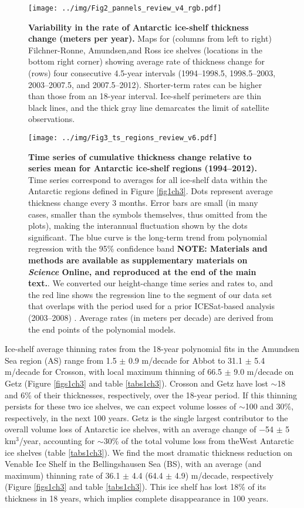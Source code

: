 \begin{figure}[!ht]
  \texttt{[image: ../img/Fig2\_pannels\_review\_v4\_rgb.pdf]}
  \caption{{\bf Variability in the rate of Antarctic ice-shelf thickness change
  (meters per year).} Maps for (columns from left to right) Filchner-Ronne,
  Amundsen,and Ross ice shelves (locations in the bottom right corner) showing
  average rate of thickness change for (rows) four consecutive 4.5-year
  intervals (1994--1998.5, 1998.5--2003, 2003--2007.5, and 2007.5--2012).
  Shorter-term rates can be higher than those from an 18-year interval.
  Ice-shelf perimeters are thin black lines, and the thick gray line demarcates
  the limit of satellite observations.}
  \label{fig2ch3}
\end{figure}


\begin{SCfigure}[.6][!ht]
  \texttt{[image: ../img/Fig3\_ts\_regions\_review\_v6.pdf]}
  \caption{{\bf Time series of cumulative thickness change relative to series
  mean for Antarctic ice-shelf regions (1994--2012).} Time series correspond to
  averages for all ice-shelf data within the Antarctic regions defined in
  Figure \ref{fig1ch3}. Dots represent average thickness change every 3 months. Error
  bars are small (in many cases, smaller than the symbols themselves, thus
  omitted from the plots), making the interannual fluctuation shown by the dots
  significant. The blue curve is the long-term trend from polynomial regression
  with the 95\% confidence band {\bf NOTE: Materials and methods are available as 
  supplementary materials on {\it Science} Online, and reproduced at the end of
  the main text.}. We converted our height-change time series and rates to, and
  the red line shows the regression line to the segment of our data set that
  overlaps with the period used for a prior ICESat-based analysis (2003--2008)
  \parencite{Pritchard2012}. Average rates (in meters per decade) are derived
  from the end points of the polynomial models.}
  \label{fig3ch3}
\end{SCfigure}


Ice-shelf average thinning rates from the 18-year polynomial fits in the
Amundsen Sea region (AS) range from 1.5 $\pm$ 0.9 m/decade for Abbot to 
31.1 $\pm$ 5.4 m/decade for Crosson, with local maximum thinning of 
66.5 $\pm$ 9.0 m/decade on Getz (Figure \ref{figs1ch3} and table
\ref{tabs1ch3}). Crosson and Getz have lost $\sim$18 and 6\% of their
thicknesses, respectively, over the 18-year period. If this thinning persists
for these two ice shelves, we can expect volume losses of $\sim$100 and 30\%,
respectively, in the next 100 years. Getz is the single largest contributor to
the overall volume loss of Antarctic ice shelves, with an average change of 
$-$54 $\pm$ 5 km$^3$/year, accounting for $\sim$30\% of the total volume loss
from theWest Antarctic ice shelves (table \ref{tabs1ch3}). We find the most
dramatic thickness reduction on Venable Ice Shelf in the Bellingshausen Sea
(BS), with an average (and maximum) thinning rate of 36.1 $\pm$ 4.4
(64.4 $\pm$ 4.9) m/decade, respectively (Figure \ref{figs1ch3} and table
\ref{tabs1ch3}). This ice shelf has lost 18\% of its thickness in 18 years,
which implies complete disappearance in 100 years.

